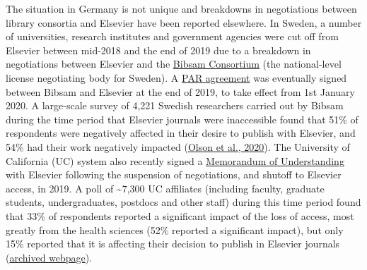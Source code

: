 \documentclass[
]{article}
\begin{document}
The situation in Germany is not unique and breakdowns in negotiations between library consortia and Elsevier have been reported elsewhere. In Sweden, a number of universities, research institutes and government agencies were cut off from Elsevier between mid-2018 and the end of 2019 due to a breakdown in negotiations between Elsevier and the \href{https://www.kb.se/samverkan-och-utveckling/oppen-tillgang-och-bibsamkonsortiet.html}{Bibsam Consortium} (the national-level license negotiating body for Sweden). A \href{https://www.kb.se/download/18.a9bd5bf1707b0801cd15e/1582893792629/Bibsam-Elsevier-2020-2022-tobepublished-titlelistexcluded.pdf}{PAR agreement} was eventually signed between Bibsam and Elsevier at the end of 2019, to take effect from 1st January 2020. A large-scale survey of 4,221 Swedish researchers carried out by Bibsam during the time period that Elsevier journals were inaccessible found that 51\% of respondents were negatively affected in their desire to publish with Elsevier, and 54\% had their work negatively impacted (\href{http://doi.org/10.1629/uksg.507}{Olson et al., 2020}). The University of California (UC) system also recently signed a \href{https://ucsf.app.box.com/s/gb2zj4dmk3h11p4munjvt9gsvtxr84qw}{Memorandum of Understanding} with Elsevier following the suspension of negotiations, and shutoff to Elsevier access, in 2019. A poll of \textasciitilde7,300 UC affiliates (including faculty, graduate students, undergraduates, postdocs and other staff) during this time period found that 33\% of respondents reported a significant impact of the loss of access, most greatly from the health sciences (52\% reported a significant impact), but only 15\% reported that it is affecting their decision to publish in Elsevier journals (\href{https://web.archive.org/web/20210518094220/https://www.library.ucsb.edu/uc-and-elsevier}{archived webpage}).
\end{document}
